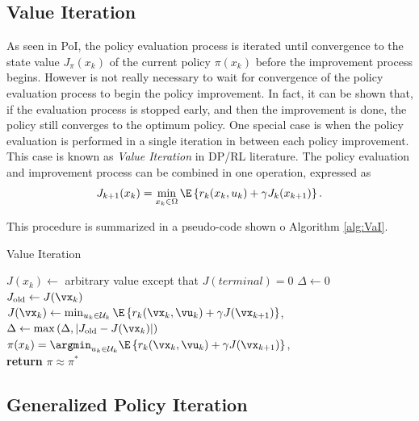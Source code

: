 \subsection{Value Iteration}
\label{sec:VaIDP}
As seen in PoI, the policy evaluation process is iterated until convergence to the state value $J_\pi(x_k)$ of the current policy $\pi(x_k)$ before the improvement process begins. However is not really necessary to wait for convergence of the policy evaluation process to begin the policy improvement. In fact, it can be shown that, if the evaluation process is stopped early, and then the improvement is done, the policy still converges to the optimum policy. One special case is when the policy evaluation is performed in a single iteration in between each policy improvement. This case is known as \textit{Value Iteration} in DP/RL literature. The policy evaluation and improvement process can be combined in one operation, expressed as
\begin{equation}
  J_{k+1}(x_k) = \min_{x_k \in \Omega} \E \left\{ r_k(x_k,u_k) + \gamma J_k(x_{k+1})\right\} 
\label{eq:VaI}.
\end{equation}

This procedure is summarized in a pseudo-code shown o Algorithm \ref{alg:VaI}.

\begin{algorithm}
  \caption{Value Iteration}\label{alg:VaI} %

  $J(x_k) \gets $ arbitrary value except that $J(terminal) = 0$
  \While{$\Delta \ge  \theta$}
  {
    $\Delta \gets 0$ \\
    {
      $J_{\text{old}} \gets J(\vx_k)$ \\
      $J(\vx_k) \gets \min_{u_k \in \mathcal{U}_k}\E \left\{ r_k(\vx_k,\vu_k) + \gamma J(\vx_{k+1}) \right\}$, \\
      $\Delta \gets \max \left(  \Delta,\left| J_{\text{old}} - J(\vx_k) \right| \right)$
    }
  }
  $\pi(x_k) = \argmin_{u_k \in \mathcal{U}_k}\E \left\{ r_k(\vx_k,\vu_k) + \gamma J(\vx_{k+1}) \right\}$, \\
  \textbf{return} $\pi \approx \pi^*$
\end{algorithm}


\subsection{Generalized Policy Iteration}
\label{sec:GPI}

